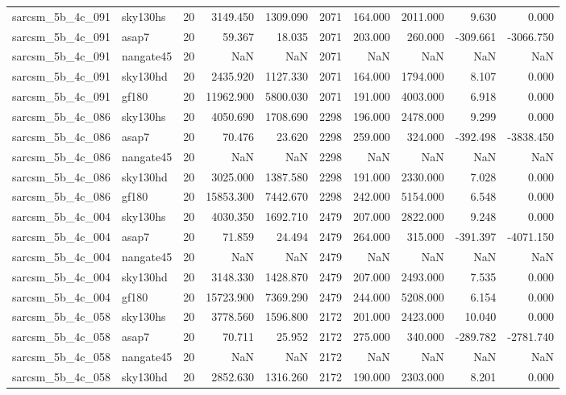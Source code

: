 \documentclass{article}
\begin{document}
\begin{longtable}{llrrrrrrrr}
sarcsm\_5b\_4c\_091 & sky130hs & 20 & 3149.450 & 1309.090 & 2071 & 164.000 & 2011.000 & 9.630 & 0.000 \\
sarcsm\_5b\_4c\_091 & asap7 & 20 & 59.367 & 18.035 & 2071 & 203.000 & 260.000 & -309.661 & -3066.750 \\
sarcsm\_5b\_4c\_091 & nangate45 & 20 & NaN & NaN & 2071 & NaN & NaN & NaN & NaN \\
sarcsm\_5b\_4c\_091 & sky130hd & 20 & 2435.920 & 1127.330 & 2071 & 164.000 & 1794.000 & 8.107 & 0.000 \\
sarcsm\_5b\_4c\_091 & gf180 & 20 & 11962.900 & 5800.030 & 2071 & 191.000 & 4003.000 & 6.918 & 0.000 \\
sarcsm\_5b\_4c\_086 & sky130hs & 20 & 4050.690 & 1708.690 & 2298 & 196.000 & 2478.000 & 9.299 & 0.000 \\
sarcsm\_5b\_4c\_086 & asap7 & 20 & 70.476 & 23.620 & 2298 & 259.000 & 324.000 & -392.498 & -3838.450 \\
sarcsm\_5b\_4c\_086 & nangate45 & 20 & NaN & NaN & 2298 & NaN & NaN & NaN & NaN \\
sarcsm\_5b\_4c\_086 & sky130hd & 20 & 3025.000 & 1387.580 & 2298 & 191.000 & 2330.000 & 7.028 & 0.000 \\
sarcsm\_5b\_4c\_086 & gf180 & 20 & 15853.300 & 7442.670 & 2298 & 242.000 & 5154.000 & 6.548 & 0.000 \\
sarcsm\_5b\_4c\_004 & sky130hs & 20 & 4030.350 & 1692.710 & 2479 & 207.000 & 2822.000 & 9.248 & 0.000 \\
sarcsm\_5b\_4c\_004 & asap7 & 20 & 71.859 & 24.494 & 2479 & 264.000 & 315.000 & -391.397 & -4071.150 \\
sarcsm\_5b\_4c\_004 & nangate45 & 20 & NaN & NaN & 2479 & NaN & NaN & NaN & NaN \\
sarcsm\_5b\_4c\_004 & sky130hd & 20 & 3148.330 & 1428.870 & 2479 & 207.000 & 2493.000 & 7.535 & 0.000 \\
sarcsm\_5b\_4c\_004 & gf180 & 20 & 15723.900 & 7369.290 & 2479 & 244.000 & 5208.000 & 6.154 & 0.000 \\
sarcsm\_5b\_4c\_058 & sky130hs & 20 & 3778.560 & 1596.800 & 2172 & 201.000 & 2423.000 & 10.040 & 0.000 \\
sarcsm\_5b\_4c\_058 & asap7 & 20 & 70.711 & 25.952 & 2172 & 275.000 & 340.000 & -289.782 & -2781.740 \\
sarcsm\_5b\_4c\_058 & nangate45 & 20 & NaN & NaN & 2172 & NaN & NaN & NaN & NaN \\
sarcsm\_5b\_4c\_058 & sky130hd & 20 & 2852.630 & 1316.260 & 2172 & 190.000 & 2303.000 & 8.201 & 0.000 \\

\end{longtable}
\end{document}
